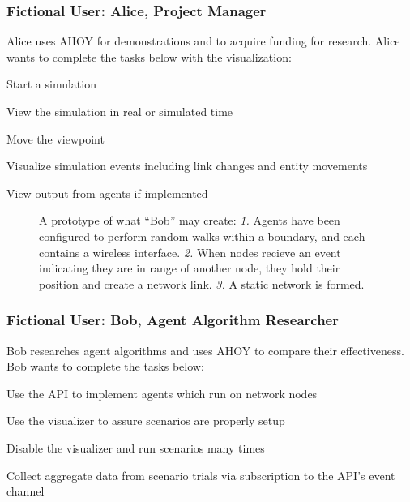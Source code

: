 \documentclass[titlepage]{article}
\begin{document}

\subsubsection{Fictional User: Alice, Project Manager%
  \label{alice}%
}

Alice uses AHOY for demonstrations and to acquire funding for research.  Alice wants to complete the tasks below with
the visualization:

\begin{itemize*}
    \item Start a simulation
    \item View the simulation in real or simulated time
    \item Move the viewpoint
    \item Visualize simulation events including link changes and entity movements
    \item View output from agents if implemented
\end{itemize*}

\begin{figure}
    \centering
    
    \caption[Prototype Use Case Diagram]%
    {A prototype of what ``Bob'' may create: \emph{1.} Agents have been configured to perform random walks within a boundary, and each contains a wireless interface. \emph{2.} When nodes recieve an event indicating they are in range of another node, they hold their position and create a network link. \emph{3.} A static network is formed.}   
\end{figure}

\subsubsection{Fictional User: Bob, Agent Algorithm Researcher%
  \label{bob}%
}

Bob researches agent algorithms and uses AHOY to compare their effectiveness.  Bob wants to complete the tasks below:

\begin{itemize*}
    \item Use the API to implement agents which run on network nodes
    \item Use the visualizer to assure scenarios are properly setup
    \item Disable the visualizer and run scenarios many times
    \item Collect aggregate data from scenario trials via subscription to the API's event channel
\end{itemize*}
\end{document}
